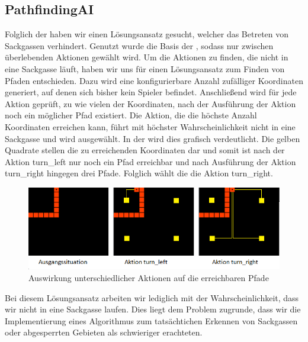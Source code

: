 \subsection{PathfindingAI}
\label{subsec:pathfinding-ai}

Folglich der  haben wir einen Lösungsansatz gesucht, welcher das Betreten von Sackgassen
verhindert.
Genutzt wurde die Basis der , sodass nur zwischen überlebenden Aktionen gewählt wird.
Um die Aktionen zu finden, die nicht in eine Sackgasse läuft, haben wir uns für einen Lösungsansatz zum Finden von
Pfaden entschieden.
Dazu wird eine konfigurierbare Anzahl zufälliger Koordinaten generiert, auf denen sich bisher kein Spieler befindet.
Anschließend wird für jede Aktion geprüft, zu wie vielen der Koordinaten, nach der Ausführung der Aktion noch ein
möglicher Pfad existiert.
Die Aktion, die die höchste Anzahl Koordinaten erreichen kann, führt mit höchster Wahrscheinlichkeit
nicht in eine Sackgasse und wird ausgewählt.
In der  wird dies grafisch verdeutlicht.
Die gelben Quadrate stellen die zu erreichenden Koordinaten dar und somit ist nach der Aktion turn\_left nur noch ein
Pfad erreichbar und nach Ausführung der Aktion turn\_right hingegen drei Pfade.
Folglich wählt die  die Aktion turn\_right.

\begin{figure}[htb]
    \centering
    \includegraphics{Bilder/pathfinding_example.png}
    \caption{Auswirkung unterschiedlicher Aktionen auf die erreichbaren Pfade}
    \label{fig:sackgasse-pfade}
\end{figure}

Bei diesem Lösungsansatz arbeiten wir lediglich mit der Wahrscheinlichkeit, dass wir nicht in eine Sackgasse laufen.
Dies liegt dem Problem zugrunde, dass wir die Implementierung eines Algorithmus zum tatsächtichen Erkennen von
Sackgassen oder abgesperrten Gebieten als schwieriger erachteten. \\

